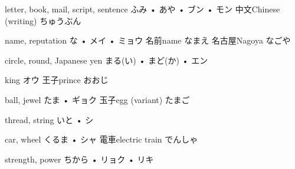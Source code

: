 



\setcounter{cardnum}{73}

		{letter, book, mail, script, sentence}
		{ふみ • あや • ブン • モン}
		{中文}{Chinese (writing) ちゅうぶん}
		{}{}
		{}{}
		{}{}
		{}{}

		{name, reputation}
		{な • メイ • ミョウ}
		{名前}{name なまえ}
		{名古屋}{Nagoya なごや}
		{}{}
		{}{}
		{}{}

		{circle, round, Japanese yen}
		{まる(い) • まど(か) • エン}
		{}{}
		{}{}
		{}{}
		{}{}
		{}{}

		{king}
		{オウ}
		{王子}{prince おおじ}
		{}{}
		{}{}
		{}{}
		{}{}

		{ball, jewel}
		{たま • ギョク}
		{玉子}{egg (variant) たまご}
		{}{}
		{}{}
		{}{}
		{}{}

		{thread, string}
		{いと • シ}
		{}{}
		{}{}
		{}{}
		{}{}
		{}{}

		{car, wheel}
		{くるま • シャ}
		{電車}{electric train でんしゃ}
		{}{}
		{}{}
		{}{}
		{}{}

		{strength, power}
		{ちから • リョク • リキ}
		{}{}
		{}{}
		{}{}
		{}{}
		{}{}

